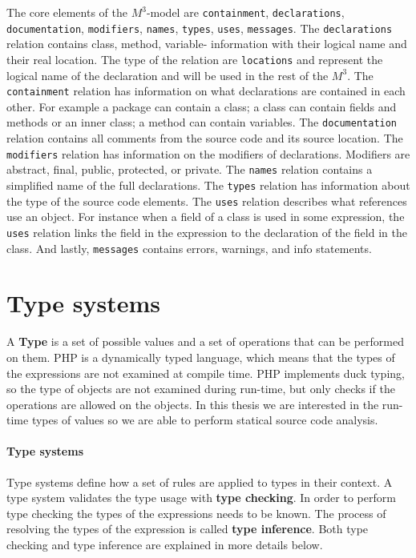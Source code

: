 \documentclass[../main.tex]{subfiles}
\begin{document}
    The core elements of the $M^3$-model are \texttt{containment}, \texttt{declarations}, \texttt{documentation}, \texttt{modifiers}, \texttt{names}, \texttt{types}, \texttt{uses}, \texttt{messages}.
    The \texttt{declarations} relation contains class, method, variable- information with their logical name and their real location. The type of the relation are \texttt{locations} and represent the logical name of the declaration and will be used in the rest of the $M^3$.
    The \texttt{containment} relation has information on what declarations are contained in each other. For example a package can contain a class; a class can contain fields and methods or an inner class; a method can contain variables.    
    The \texttt{documentation} relation contains all comments from the source code and its source location.
    The \texttt{modifiers} relation has information on the modifiers of declarations. Modifiers are abstract, final, public, protected, or private.
    The \texttt{names} relation contains a simplified name of the full declarations.
    The \texttt{types} relation has information about the type of the source code elements.
    The \texttt{uses} relation describes what references use an object. For instance when a field of a class is used in some expression, the \texttt{uses} relation links the field in the expression to the declaration of the field in the class.
    And lastly, \texttt{messages} contains errors, warnings, and info statements.
    
    
    \section{Type systems}\label{sec:background_type-system}
    A \textbf{Type} is a set of possible values and a set of operations that can be performed on them.
    PHP is a dynamically typed language, which means that the types of the expressions are not examined at compile time.
    PHP implements duck typing, so the type of objects are not examined during run-time, but only checks if the operations are allowed on the objects.
    In this thesis we are interested in the run-time types of values so we are able to perform statical source code analysis.
   
    \paragraph{Type systems} Type systems define how a set of rules are applied to types in their context.
    A type system validates the type usage with \textbf{type checking}.
    In order to perform type checking the types of the expressions needs to be known.
    The process of resolving the types of the expression is called \textbf{type inference}.
    Both type checking and type inference are explained in more details below.
    
\end{document}
